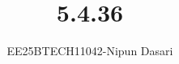 \documentclass[journal]{IEEEtran}
\begin{document}
	
	
	\vspace{3cm}
	
	\title{5.4.36}
	\author{EE25BTECH11042-Nipun Dasari}
	\maketitle
	{\let\newpage\relax\maketitle}
	
	\renewcommand{\thefigure}{\theenumi}
	\renewcommand{\thetable}{\theenumi}
	\setlength{\intextsep}{10pt} %
	
	
	\renewcommand{\thetable}{\theenumi}
	
\end{document}
